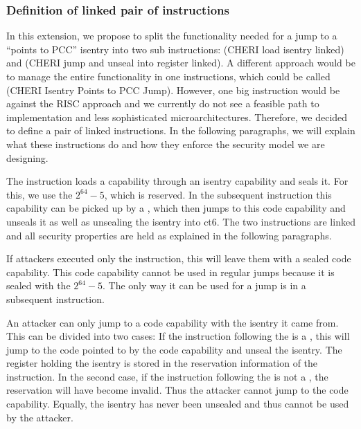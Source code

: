 \subsubsection{Definition of linked pair of instructions}

In this extension, we propose to split the functionality needed for a jump to a ``points to PCC'' isentry into two sub instructions:  (CHERI load isentry linked) and  (CHERI jump and unseal into register linked).
A different approach would be to manage the entire functionality in one instructions, which could be called  (CHERI Isentry Points to PCC Jump).
However, one big instruction would be against the RISC approach and we currently do not see a feasible path to implementation and less sophisticated microarchitectures.
Therefore, we decided to define a pair of linked instructions.
In the following paragraphs, we will explain what these instructions do and how they enforce the security model we are designing.

The  instruction loads a capability through an isentry capability and seals it.
For this, we use the \cotype{} $2^{64} - 5$, which is reserved.
In the subsequent instruction this capability can be picked up by a , which then jumps to this code capability and unseals it as well as unsealing the isentry into ct6.
The two instructions are linked and all security properties are held as explained in the following paragraphs.

If attackers executed only the  instruction, this will leave them with a sealed code capability.
This code capability cannot be used in regular jumps because it is sealed with the \cotype{} $2^{64} - 5$.
The only way it can be used for a jump is in a subsequent  instruction.

An attacker can only jump to a code capability with the isentry it came from.
This can be divided into two cases: If the instruction following the  is a , this will jump to the code pointed to by the code capability and unseal the isentry.
The register holding the isentry is stored in the reservation information of the  instruction.
In the second case, if the instruction following the  is not a , the reservation will have become invalid.
Thus the attacker cannot jump to the code capability.
Equally, the isentry has never been unsealed and thus cannot be used by the attacker.

